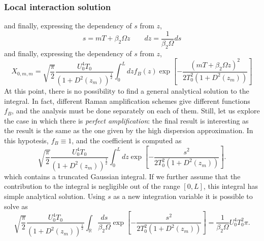 \documentclass[8pt]{beamer} %
\begin{document}
\begin{frame}
    \frametitle{Local interaction solution}
    and finally, expressing the dependency of $s$ from $z$,
    \begin{equation}
        s = mT+\beta_2\Omega z  \qquad dz = \dfrac{1}{\beta_2\Omega}ds
    \end{equation}
    and finally, expressing the dependency of $s$ from $z$,
    \begin{equation}\label{THE_INTEGRAL}
        X_{0, m, m} = \sqrt{\dfrac{\pi}{2}}\dfrac{U_0^4 T_0}{(1+D^2(z_m))^{\frac{1}{2}}} \int_{0}^{L} dz f_B(z) \exp\left[-\dfrac{(mT+\beta_2\Omega z)^2}{2T_0^2(1+D^2(z_m))} \right]
    \end{equation}
    At this point, there is no possibility to find a general analytical solution to the integral. In fact, different Raman amplification schemes give different functions $f_B$, and the analysis must be done separately on each of them.
    Still, let us explore the case in which there is \textit{perfect amplification}: the final result is interesting as the result is the same as the one given by the high dispersion approximation. In this hypotesis, $f_B \equiv 1$, and the coefficient is computed as
    \begin{equation}\label{pa-first}
        \sqrt{\dfrac{\pi}{2}}\dfrac{U_0^4 T_0}{(1+D^2(z_m))^{\frac{1}{2}}} \int_{0}^{L}dz \exp\left[-\dfrac{s^2}{2T_0^2(1+D^2(z_m))} \right].
    \end{equation}
    which contains a truncated Gaussian integral. If we further assume that the contribution to the integral is negligible out of the range $[0, L]$, this integral has simple analytical solution.
    Using $s$ as a new integration variable it is possible to solve as
    \begin{equation}
        \sqrt{\dfrac{\pi}{2}}\dfrac{U_0^4 T_0}{(1+D^2(z_m))^{\frac{1}{2}}} \int_{\mathbb{R}} \dfrac{ds}{\beta_2 \Omega} \exp\left[-\dfrac{s^2}{2T_0^2(1+D^2(z_m))} \right] = \dfrac{1}{\beta_2 \Omega} U_0^4 T_0^2 \pi.
    \end{equation}
\end{frame}
\end{document}
